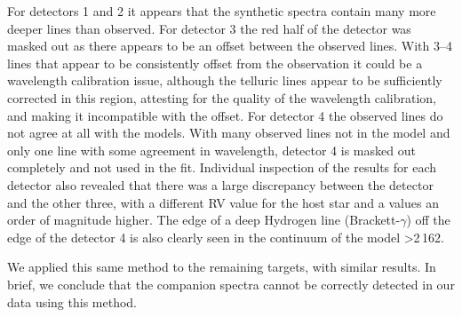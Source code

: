 For detectors 1 and 2 it appears that the synthetic spectra contain many more deeper lines than observed.
For detector 3 the red half of the detector was masked out as there appears to be an offset between the observed lines.
With 3--4 lines that appear to be consistently offset from the observation it could be a wavelength calibration issue, although the telluric lines appear to be sufficiently corrected in this region, attesting for the quality of the wavelength calibration, and making it incompatible with the offset.
For detector 4 the observed lines do not agree at all with the models.
With many observed lines not in the model and only one line with some agreement in wavelength, detector 4 is masked out completely and not used in the \textchisquared{} fit.
Individual inspection of the \textchisquared{} results for each detector also revealed that there was a large discrepancy between the  detector and the other three, with a different {RV} value for the host star and a \textchisquared{} values an order of magnitude higher.
The edge of a deep Hydrogen line (Brackett-\(\gamma\)) off the edge of the detector 4 is also clearly seen in the continuum of the model >2\,162\nm{}.

We applied this same method to the remaining targets, with similar results.
In brief, we conclude that the companion spectra cannot be correctly detected in our data using this method.

